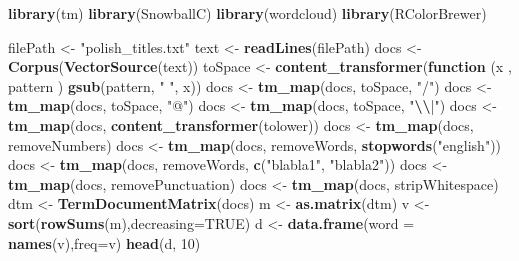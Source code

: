 \documentclass[
  12pt,
]{article}
\newenvironment{Shaded}{\begin{snugshade}}{\end{snugshade}}
\newcommand{\AttributeTok}[1]{\textcolor[rgb]{0.13,0.29,0.53}{#1}}
\newcommand{\ConstantTok}[1]{\textcolor[rgb]{0.56,0.35,0.01}{#1}}
\newcommand{\ControlFlowTok}[1]{\textcolor[rgb]{0.13,0.29,0.53}{\textbf{#1}}}
\newcommand{\DecValTok}[1]{\textcolor[rgb]{0.00,0.00,0.81}{#1}}
\newcommand{\FunctionTok}[1]{\textcolor[rgb]{0.13,0.29,0.53}{\textbf{#1}}}
\newcommand{\NormalTok}[1]{#1}
\newcommand{\OtherTok}[1]{\textcolor[rgb]{0.56,0.35,0.01}{#1}}
\newcommand{\SpecialCharTok}[1]{\textcolor[rgb]{0.81,0.36,0.00}{\textbf{#1}}}
\newcommand{\StringTok}[1]{\textcolor[rgb]{0.31,0.60,0.02}{#1}}
\begin{document}
\begin{Shaded}
\begin{Highlighting}[]
\FunctionTok{library}\NormalTok{(tm)}
\FunctionTok{library}\NormalTok{(SnowballC)}
\FunctionTok{library}\NormalTok{(wordcloud)}
\FunctionTok{library}\NormalTok{(RColorBrewer)}

\NormalTok{filePath }\OtherTok{\textless{}{-}} \StringTok{"polish\_titles.txt"}
\NormalTok{text }\OtherTok{\textless{}{-}} \FunctionTok{readLines}\NormalTok{(filePath)}
\NormalTok{docs }\OtherTok{\textless{}{-}} \FunctionTok{Corpus}\NormalTok{(}\FunctionTok{VectorSource}\NormalTok{(text))}
\NormalTok{toSpace }\OtherTok{\textless{}{-}} \FunctionTok{content\_transformer}\NormalTok{(}\ControlFlowTok{function}\NormalTok{ (x , pattern ) }\FunctionTok{gsub}\NormalTok{(pattern, }\StringTok{" "}\NormalTok{, x))}
\NormalTok{docs }\OtherTok{\textless{}{-}} \FunctionTok{tm\_map}\NormalTok{(docs, toSpace, }\StringTok{"/"}\NormalTok{)}
\NormalTok{docs }\OtherTok{\textless{}{-}} \FunctionTok{tm\_map}\NormalTok{(docs, toSpace, }\StringTok{"@"}\NormalTok{)}
\NormalTok{docs }\OtherTok{\textless{}{-}} \FunctionTok{tm\_map}\NormalTok{(docs, toSpace, }\StringTok{"}\SpecialCharTok{\textbackslash{}\textbackslash{}}\StringTok{|"}\NormalTok{)}
\NormalTok{docs }\OtherTok{\textless{}{-}} \FunctionTok{tm\_map}\NormalTok{(docs, }\FunctionTok{content\_transformer}\NormalTok{(tolower))}
\NormalTok{docs }\OtherTok{\textless{}{-}} \FunctionTok{tm\_map}\NormalTok{(docs, removeNumbers)}
\NormalTok{docs }\OtherTok{\textless{}{-}} \FunctionTok{tm\_map}\NormalTok{(docs, removeWords, }\FunctionTok{stopwords}\NormalTok{(}\StringTok{"english"}\NormalTok{))}
\NormalTok{docs }\OtherTok{\textless{}{-}} \FunctionTok{tm\_map}\NormalTok{(docs, removeWords, }\FunctionTok{c}\NormalTok{(}\StringTok{"blabla1"}\NormalTok{, }\StringTok{"blabla2"}\NormalTok{)) }
\NormalTok{docs }\OtherTok{\textless{}{-}} \FunctionTok{tm\_map}\NormalTok{(docs, removePunctuation)}
\NormalTok{docs }\OtherTok{\textless{}{-}} \FunctionTok{tm\_map}\NormalTok{(docs, stripWhitespace)}
\NormalTok{dtm }\OtherTok{\textless{}{-}} \FunctionTok{TermDocumentMatrix}\NormalTok{(docs)}
\NormalTok{m }\OtherTok{\textless{}{-}} \FunctionTok{as.matrix}\NormalTok{(dtm)}
\NormalTok{v }\OtherTok{\textless{}{-}} \FunctionTok{sort}\NormalTok{(}\FunctionTok{rowSums}\NormalTok{(m),}\AttributeTok{decreasing=}\ConstantTok{TRUE}\NormalTok{)}
\NormalTok{d }\OtherTok{\textless{}{-}} \FunctionTok{data.frame}\NormalTok{(}\AttributeTok{word =} \FunctionTok{names}\NormalTok{(v),}\AttributeTok{freq=}\NormalTok{v)}
\FunctionTok{head}\NormalTok{(d, }\DecValTok{10}\NormalTok{)}
\end{Highlighting}
\end{Shaded}
\end{document}
